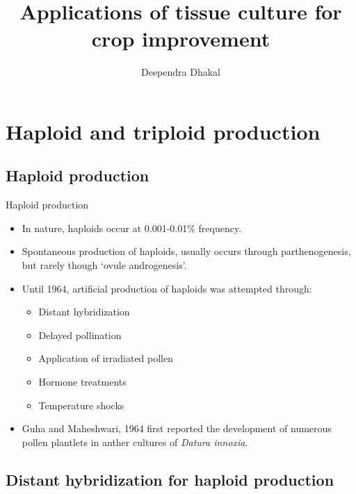 \documentclass[
  ignorenonframetext,
  aspectratio=169]{beamer}
\title{Applications of tissue culture for crop improvement}
\author{Deependra Dhakal}
\date{}
\institute{Agriculture and Forestry University}
\providecommand{\tightlist}{%
  \setlength{\itemsep}{0pt}\setlength{\parskip}{0pt}}
\begin{document}
\frame{\titlepage}

\begin{frame}[allowframebreaks]
  \tableofcontents[hideallsubsections]
\end{frame}
\hypertarget{haploid-and-triploid-production}{%
\section{Haploid and triploid
production}\label{haploid-and-triploid-production}}

\hypertarget{haploid-production}{%
\subsection{Haploid production}\label{haploid-production}}

\begin{frame}{Haploid production}
\begin{itemize}
\tightlist
\item
  In nature, haploids occur at 0.001-0.01\% frequency.
\item
  Spontaneous production of haploids, usually occurs through
  parthenogenesis, but rarely though `ovule androgenesis'.
\item
  Until 1964, artificial production of haploids was attempted through:

  \begin{itemize}
  \tightlist
  \item
    Distant hybridization
  \item
    Delayed pollination
  \item
    Application of irradiated pollen
  \item
    Hormone treatments
  \item
    Temperature shocks
  \end{itemize}
\item
  Guha and Maheshwari, 1964 first reported the development of numerous
  pollen plantlets in anther cultures of \emph{Datura innoxia}.
\end{itemize}
\end{frame}

\hypertarget{distant-hybridization-for-haploid-production}{%
\subsection{Distant hybridization for haploid
production}\label{distant-hybridization-for-haploid-production}}
\end{document}
